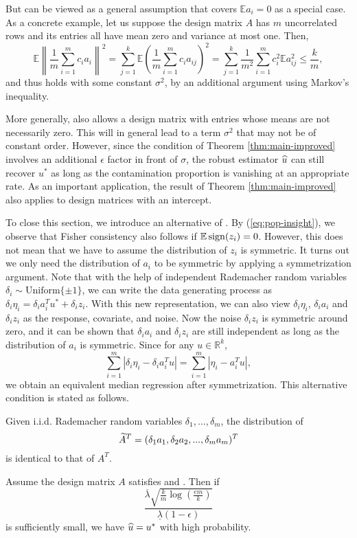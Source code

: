 But \conditionA{} can be viewed as a general assumption that covers $\mathbb{E}a_i=0$ as a special case. As a concrete example, let us suppose the design matrix $A$ has $m$ uncorrelated rows and its entries all have mean zero and variance at most one. Then,
$$\mathbb{E}\left\|\frac{1}{m}\sum_{i=1}^mc_ia_i\right\|^2=\sum_{j=1}^k\mathbb{E}\left(\frac{1}{m}\sum_{i=1}^mc_ia_{ij}\right)^2=\sum_{j=1}^k\frac{1}{m^2}\sum_{i=1}^mc_i^2\mathbb{E}a_{ij}^2\leq \frac{k}{m},$$
and thus \conditionA{} holds with some constant $\sigma^2$, by an additional argument using Markov's inequality.

More generally, \conditionA{} also allows a design matrix with entries whose means are not necessarily zero. This will in general lead to a term $\sigma^2$ that may not be of constant order. However, since the condition of Theorem \ref{thm:main-improved} involves an additional $\epsilon$ factor in front of $\sigma$, the robust estimator $\widehat{u}$ can still recover $u^*$ as long as the contamination proportion is vanishing at an appropriate rate. As an important application, the result of Theorem \ref{thm:main-improved} also applies to design matrices with an intercept.

To close this section, we introduce an alternative of \conditionA. By (\ref{eq:pop-insight}), we observe that Fisher consistency also follows if $\mathbb{E}\mathop{\rm sign}(z_i)=0$. However, this does not mean that we have to assume the distribution of $z_i$ is symmetric. It turns out we only need the distribution of $a_i$ to be symmetric by applying a symmetrization argument.
Note that with the help of independent Rademacher random variables $\delta_i\sim\text{Uniform}\{\pm 1\}$, we can write the data generating process as $\delta_i\eta_i=\delta_ia_i^Tu^*+\delta_iz_i$. With this new representation, we can also view $\delta_i\eta_i$, $\delta_ia_i$ and $\delta_iz_i$ as the response, covariate, and noise. Now the noise $\delta_iz_i$ is symmetric around zero, and it can be shown that $\delta_ia_i$ and $\delta_iz_i$ are still independent as long as the distribution of $a_i$ is symmetric. Since for any $u\in\mathbb{R}^k$,
$$\sum_{i=1}^m|\delta_i\eta_i- \delta_ia_i^Tu|=\sum_{i=1}^m|\eta_i-a_i^Tu|,$$
we obtain an equivalent median regression after symmetrization.
This alternative condition is stated as follows.

\begin{con1}
Given i.i.d. Rademacher random variables $\delta_1,...,\delta_m$, the distribution of
$$\widetilde{A}^T=(\delta_1a_1,\delta_2a_2,...,\delta_ma_m)^T$$
is identical to that of $A^T$.
\end{con1}

\begin{thm}\label{thm:robust-reg}
Assume the design matrix $A$ satisfies \conditionAp{} and \conditionB. Then if $$\frac{\overline{\lambda}\sqrt{\frac{k}{m}\log\left(\frac{em}{k}\right)}}{\underline{\lambda}(1-\epsilon)}$$
is sufficiently small, we have $\widehat{u}=u^*$ with high probability.
\end{thm}
